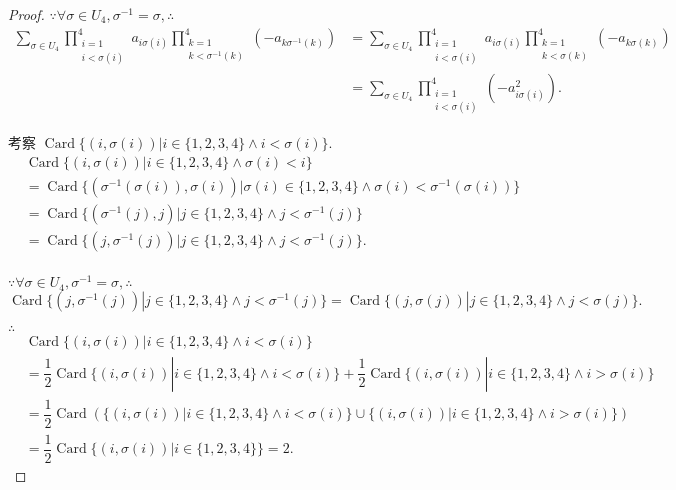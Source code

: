 \documentclass{ctexart}
\begin{document}
\begin{proof}
    $\because\forall\sigma\in U_4,\sigma^{-1}=\sigma,\therefore$
    \begin{align*}
        \sum\limits_{\sigma\in U_4}\prod\limits_{\substack{i=1\\i<\sigma(i)}}^4a_{i\sigma(i)}\prod\limits_{\substack{k=1\\k<\sigma^{-1}(k)}}^4(-a_{k\sigma^{-1}(k)}) & =\sum\limits_{\sigma\in U_4}\prod\limits_{\substack{i=1\\i<\sigma(i)}}^4a_{i\sigma(i)}\prod\limits_{\substack{k=1\\k<\sigma(k)}}^4(-a_{k\sigma(k)}) \\
        & =\sum\limits_{\sigma\in U_4}\prod\limits_{\substack{i=1\\i<\sigma(i)}}^4(-a_{i\sigma(i)}^2).
    \end{align*}

    考察 $\operatorname{Card}\{(i,\sigma(i))|i\in\{1,2,3,4\}\land i<\sigma(i)\}$.
    \begin{align*}
        & \operatorname{Card}\{(i,\sigma(i))|i\in\{1,2,3,4\}\land\sigma(i)<i\} \\
        & =\operatorname{Card}\{(\sigma^{-1}(\sigma(i)),\sigma(i))|\sigma(i)\in\{1,2,3,4\}\land\sigma(i)<\sigma^{-1}(\sigma(i))\} \\
        & =\operatorname{Card}\{(\sigma^{-1}(j),j)|j\in\{1,2,3,4\}\land j<\sigma^{-1}(j)\} \\
        & =\operatorname{Card}\{(j,\sigma^{-1}(j))|j\in\{1,2,3,4\}\land j<\sigma^{-1}(j)\}. \\
    \end{align*}

    $\because\forall\sigma\in U_4,\sigma^{-1}=\sigma,\therefore$
    \[\operatorname{Card}\{(j,\sigma^{-1}(j))|j\in\{1,2,3,4\}\land j<\sigma^{-1}(j)\}=\operatorname{Card}\{(j,\sigma(j))|j\in\{1,2,3,4\}\land j<\sigma(j)\}.\]

    $\therefore$
    \begin{align*}
        & \operatorname{Card}\{(i,\sigma(i))|i\in\{1,2,3,4\}\land i<\sigma(i)\} \\
        & =\dfrac{1}{2}\operatorname{Card}\{(i,\sigma(i))|i\in\{1,2,3,4\}\land i<\sigma(i)\}+\dfrac{1}{2}\operatorname{Card}\{(i,\sigma(i))|i\in\{1,2,3,4\}\land i>\sigma(i)\} \\
        & =\dfrac{1}{2}\operatorname{Card}(\{(i,\sigma(i))|i\in\{1,2,3,4\}\land i<\sigma(i)\}\cup\{(i,\sigma(i))|i\in\{1,2,3,4\}\land i>\sigma(i)\}) \\
        & =\dfrac{1}{2}\operatorname{Card}\{(i,\sigma(i))|i\in\{1,2,3,4\}\}=2.
    \end{align*}


\end{proof}
\end{document}
